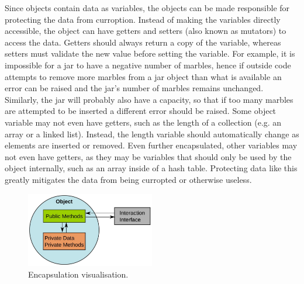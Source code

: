 \documentclass[11pt]{article}
\begin{document}
Since objects contain data as variables, the objects can be made responsible for protecting the data from curroption. Instead of making the variables directly accessible, the object can have getters and setters (also known as mutators) to access the data. Getters should always return a copy of the variable, whereas setters must validate the new value before setting the variable. For example, it is impossible for a jar to have a negative number of marbles, hence if outside code attempts to remove more marbles from a jar object than what is available an error can be raised and the jar's number of marbles remains unchanged. Similarly, the jar will probably also have a capacity, so that if too many marbles are attempted to be inserted a different error should be raised. Some object variable may not even have getters, such as the length of a collection (e.g. an array or a linked list). Instead, the length variable should automatically change as elements are inserted or removed. Even further encapsulated, other variables may not even have getters, as they may be variables that should only be used by the object internally, such as an array inside of a hash table. Protecting data like this greatly mitigates the data from being curropted or otherwise useless.

\begin{figure}[b!]
    \centering
    \includegraphics[width=0.5\textwidth]{figures/encapsulation.jpg}
    \caption{Encapsulation visualisation.}
    \label{fig:encapsulation}
\end{figure}
\end{document}
